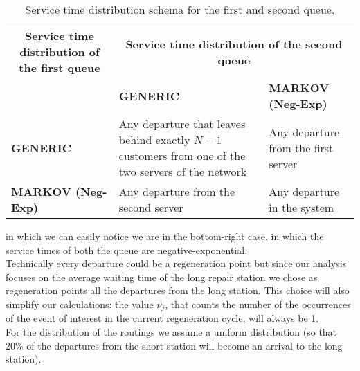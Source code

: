 \documentclass[12pt]{article}
\begin{document}
		\begin{table}[H]
			\centering
			\renewcommand{\arraystretch}{1.5}
			\begin{tabular}{|m{4cm}|m{4cm}|m{4cm}|}
				\hline
				\multicolumn{1}{|c|}{\textbf{Service time distribution of the first queue}} &
				\multicolumn{2}{c|}{\textbf{Service time distribution of the second queue}} \\ 
				\cline{2-3}
				& \textbf{GENERIC} & \textbf{MARKOV (Neg-Exp)} \\ 
				\hline
				\textbf{GENERIC} & Any departure that leaves behind exactly $N - 1$ customers from one of the two servers of the network & Any departure from the first server \\ 
				\hline
				\textbf{MARKOV (Neg-Exp)} & Any departure from the second server & Any departure in the system \\ 
				\hline
			\end{tabular}
			\caption{Service time distribution schema for the first and second queue.}
		\end{table}
	in which we can easily notice we are in the bottom-right case, in which the service times of both the queue are negative-exponential.\\
	Technically every departure could be a regeneration point but since our analysis focuses on the average waiting time of the long repair station we chose as regeneration points all the departures from the long station. 
	This choice will also simplify our calculations: the value $\nu_{j}$, that counts the number of the occurrences of the event of interest in the current regeneration cycle, will always be 1. \\
	For the distribution of the routings we assume a uniform distribution (so that 20\% of the departures from the short station will become an arrival to the long station).
\end{document}

